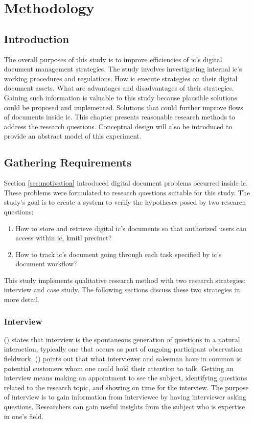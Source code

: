 \chapter{Methodology}
\section{Introduction}
The overall purposes of this study is to improve efficiencies of \gls{ic}'s digital document management strategies. 
The study involves investigating internal \gls{ic}'s working procedures and regulations.
How \gls{ic} execute strategies on their digital document assets.
What are advantages and disadvantages of their strategies.
Gaining such information is valuable to this study because plausible solutions could be proposed and implemented. 
Solutions that could further improve flows of documents inside \gls{ic}.
This chapter presents reasonable research methods to address the research questions.
Conceptual design will also be introduced to provide an abstract model of this experiment.

\section{Gathering Requirements}
Section \ref{sec:motivation} introduced digital document problems occurred inside \gls{ic}.
These problems were formulated to research questions suitable for this study.
The study's goal is to create a system to verify the hypotheses posed by two research questions:
\begin{enumerate}
	\item How to store and retrieve digital \gls{ic}'s documents so that authorized users can access within \gls{ic}, \gls{kmitl} precinct?
	\item How to track \gls{ic}'s document going through each task specified by \gls{ic}'s document workflow?
\end{enumerate}
This study implements qualitative research method with two research strategies: interview and case study.
The following sections discuss these two strategies in more detail.

\subsection{Interview}
\citeauthor{gall7j} (\citeyear{gall7j}) states that interview is the spontaneous generation of questions in a natural interaction, typically one that occurs as part of ongoing participant observation fieldwork.
\citeauthor{brady2011craft} (\citeyear{brady2011craft}) points out that what interviewer and salesman have in common is potential customers whom one could hold their attention to talk.
Getting an interview means making an appointment to see the subject, identifying questions related to the research topic, and showing on time for the interview.
The purpose of interview is to gain information from interviewee by having interviewer asking questions.
Researchers can gain useful insights from the subject who is expertise in one's field.

